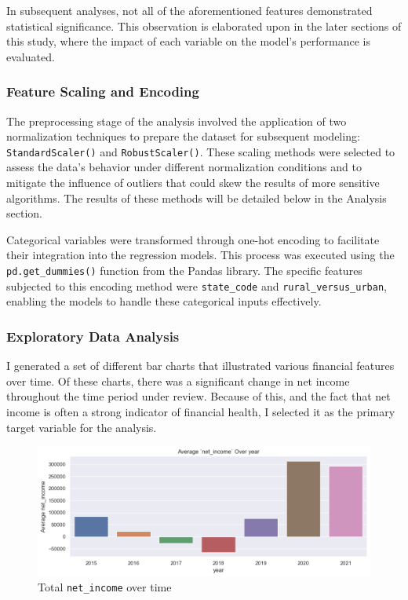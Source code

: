 \documentclass{article}
\theoremstyle{mytheoremstyle}
\theoremstyle{mytheoremstyle}
\theoremstyle{myproblemstyle}
\begin{document}
In subsequent analyses, not all of the aforementioned features demonstrated statistical significance. This observation is elaborated upon in the later sections of this study, where the impact of each variable on the model's performance is evaluated.

\subsubsection{Feature Scaling and Encoding}
The preprocessing stage of the analysis involved the application of two normalization techniques to prepare the dataset for subsequent modeling: \texttt{StandardScaler()} and \texttt{RobustScaler()}. These scaling methods were selected to assess the data’s behavior under different normalization conditions and to mitigate the influence of outliers that could skew the results of more sensitive algorithms. The results of these methods will be detailed below in the Analysis section. 

Categorical variables were transformed through one-hot encoding to facilitate their integration into the regression models. This process was executed using the \texttt{pd.get\_dummies()} function from the Pandas library. The specific features subjected to this encoding method were \texttt{state\_code} and \texttt{rural\_versus\_urban}, enabling the models to handle these categorical inputs effectively.


\subsubsection{Exploratory Data Analysis}
I generated a set of different bar charts that illustrated various financial features over time. Of these charts, there was a significant change in net income throughout the time period under review. Because of this, and the fact that net income is often a strong indicator of financial health, I selected it as the primary target variable for the analysis.

\begin{figure}[htbp]
\centering
\includegraphics[width=\linewidth]{Images/netincome.png}
\caption{Total \texttt{net\_income} over time}
\label{fig:netincome EDA}
\end{figure}
\end{document}
